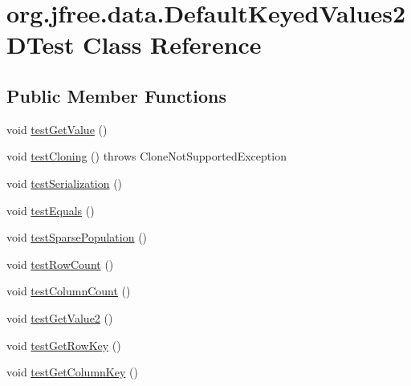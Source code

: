 \hypertarget{classorg_1_1jfree_1_1data_1_1_default_keyed_values2_d_test}{}\section{org.\+jfree.\+data.\+Default\+Keyed\+Values2\+D\+Test Class Reference}
\label{classorg_1_1jfree_1_1data_1_1_default_keyed_values2_d_test}
\subsection*{Public Member Functions}
\begin{DoxyCompactItemize}
\item 
void \mbox{\hyperlink{classorg_1_1jfree_1_1data_1_1_default_keyed_values2_d_test_abb665de1c7fe9503cf25557cc3d9bdda}{test\+Get\+Value}} ()
\item 
void \mbox{\hyperlink{classorg_1_1jfree_1_1data_1_1_default_keyed_values2_d_test_acbe95777d5809a957b932b48ce8dd3d4}{test\+Cloning}} ()  throws Clone\+Not\+Supported\+Exception 
\item 
void \mbox{\hyperlink{classorg_1_1jfree_1_1data_1_1_default_keyed_values2_d_test_a12b7a12a4105599bcd98d07d34fb9adb}{test\+Serialization}} ()
\item 
void \mbox{\hyperlink{classorg_1_1jfree_1_1data_1_1_default_keyed_values2_d_test_a984eb2d0c55cb376ceb1688f169a2e18}{test\+Equals}} ()
\item 
void \mbox{\hyperlink{classorg_1_1jfree_1_1data_1_1_default_keyed_values2_d_test_a81b142f2a53200d53e410fdee01939f5}{test\+Sparse\+Population}} ()
\item 
void \mbox{\hyperlink{classorg_1_1jfree_1_1data_1_1_default_keyed_values2_d_test_a3d8f0a12691fd5911b3835205c5ae91e}{test\+Row\+Count}} ()
\item 
void \mbox{\hyperlink{classorg_1_1jfree_1_1data_1_1_default_keyed_values2_d_test_a7fbf4517e516ee629f0ed0be4722b5e5}{test\+Column\+Count}} ()
\item 
void \mbox{\hyperlink{classorg_1_1jfree_1_1data_1_1_default_keyed_values2_d_test_a00e504840039c54aaac34b33edc08b20}{test\+Get\+Value2}} ()
\item 
void \mbox{\hyperlink{classorg_1_1jfree_1_1data_1_1_default_keyed_values2_d_test_a5be1af2c8d83552d69b22a0ba3a9035e}{test\+Get\+Row\+Key}} ()
\item 
void \mbox{\hyperlink{classorg_1_1jfree_1_1data_1_1_default_keyed_values2_d_test_ac9893d2c738e2befa8a71a3d7720a8b9}{test\+Get\+Column\+Key}} ()

\end{DoxyCompactItemize}
